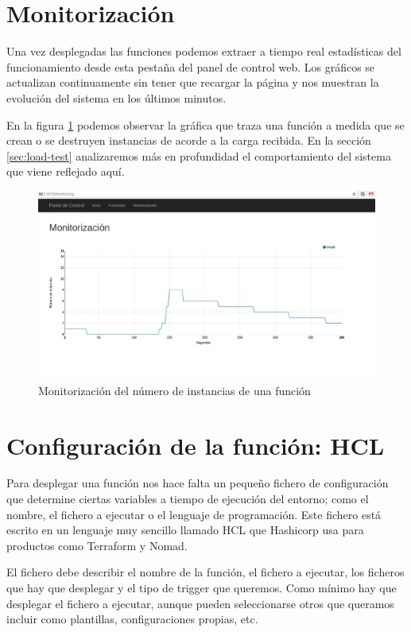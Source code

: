 \section{Monitorización}

Una vez desplegadas las funciones podemos extraer a tiempo real estadísticas del funcionamiento desde esta pestaña del panel de control web. Los gráficos se actualizan continuamente sin tener que recargar la página y nos muestran la evolución del sistema en los últimos minutos.

En la figura \ref{fig:monitoring} podemos observar la gráfica que traza una función a medida que se crean o se destruyen instancias de acorde a la carga recibida. En la sección \ref{sec:load-test} analizaremos más en profundidad el comportamiento del sistema que viene reflejado aquí.

\begin{figure}[H]
    \centering
    \includegraphics[width=\textwidth]{../images/fnapi/monitoring.png}
    \caption{Monitorización del número de instancias de una función}
    \label{fig:monitoring}
\end{figure}

\section{Configuración de la función: HCL}
\label{sec:hcl}

Para desplegar una función nos hace falta un pequeño fichero de configuración que determine ciertas variables a tiempo de ejecución del entorno; como el nombre, el fichero a ejecutar o el lenguaje de programación. Este fichero está escrito en un lenguaje muy sencillo llamado HCL\cite{hcl} que Hashicorp\cite{hashicorp} usa para productos como Terraform y Nomad\cite{nomad}.

El fichero debe describir el nombre de la función, el fichero a ejecutar, los ficheros que hay que desplegar y el tipo de trigger que queremos. Como mínimo hay que desplegar el fichero a ejecutar, aunque pueden seleccionarse otros que queramos incluir como plantillas, configuraciones propias, etc.

